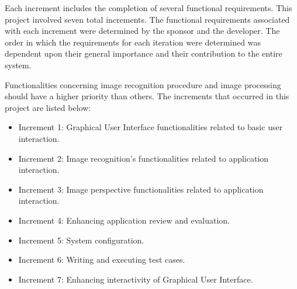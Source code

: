 \par Each increment includes the completion of several functional requirements. This project involved seven total increments.  The functional requirements associated with each increment were determined by the sponsor and the developer.  The order in which the requirements for each iteration were determined was dependent upon their general importance and their contribution to the entire system.
\par Functionalities concerning image recognition procedure  and image processing should have a higher priority than others. The increments that occurred in this project are listed below:
\begin{itemize}
\item Increment 1: Graphical User Interface functionalities related to basic user interaction.
\item Increment 2: Image recognition's functionalities related to application interaction.
\item Increment 3: Image perspective functionalities related to application interaction.
\item Increment 4: Enhancing application review and evaluation.
\item Increment 5: System configuration.
\item Increment 6: Writing and executing test cases.
\item Increment 7: Enhancing interactivity of Graphical User Interface.
\end{itemize}